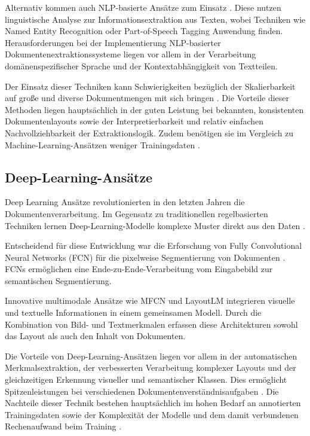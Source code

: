 Alternativ kommen auch NLP-basierte Ansätze zum Einsatz \parencite{ChowdhuryGobindaG.1999Tmfi, MarinaiS.2005Annf}. Diese nutzen linguistische Analyse zur Informationsextraktion aus Texten, wobei Techniken wie Named Entity Recognition oder Part-of-Speech Tagging Anwendung finden. Herausforderungen bei der Implementierung NLP-basierter Dokumentenextraktionssysteme liegen vor allem in der Verarbeitung domänenspezifischer Sprache und der Kontextabhängigkeit von Textteilen.

Der Einsatz dieser Techniken kann Schwierigkeiten bezüglich der Skalierbarkeit auf große und diverse Dokumentmengen mit sich bringen \parencite{ChowdhuryGobindaG.1999Tmfi, YeYibin2018Auso}. Die Vorteile dieser Methoden liegen hauptsächlich in der guten Leistung bei bekannten, konsistenten Dokumentenlayouts sowie der Interpretierbarkeit und relativ einfachen Nachvollziehbarkeit der Extraktionslogik. Zudem benötigen sie im Vergleich zu Machine-Learning-Ansätzen weniger Trainingsdaten \parencite{ChowdhuryGobindaG.1999Tmfi, MarinaiS.2005Annf}.

\subsection{Deep-Learning-Ansätze}
\label{subsec:deep-learning-ansätze}

Deep Learning Ansätze revolutionierten in den letzten Jahren die Dokumentenverarbeitung. Im Gegensatz zu traditionellen regelbasierten Techniken lernen Deep-Learning-Modelle komplexe Muster direkt aus den Daten \parencite{YangXiao2017LtES, XuYiheng2020LPoT}.

Entscheidend für diese Entwicklung war die Erforschung von Fully Convolutional Neural Networks (FCN) für die pixelweise Segmentierung von Dokumenten \parencite{YangXiao2017LtES}. FCNs ermöglichen eine Ende-zu-Ende-Verarbeitung vom Eingabebild zur semantischen Segmentierung.

Innovative multimodale Ansätze wie MFCN \parencite{YangXiao2017LtES} und LayoutLM \parencite{XuYiheng2020LPoT} integrieren visuelle und textuelle Informationen in einem gemeinsamen Modell. Durch die Kombination von Bild- und Textmerkmalen erfassen diese Architekturen sowohl das Layout als auch den Inhalt von Dokumenten.

Die Vorteile von Deep-Learning-Ansätzen liegen vor allem in der automatischen Merkmalsextraktion, der verbesserten Verarbeitung komplexer Layouts und der gleichzeitigen Erkennung visueller und semantischer Klassen. Dies ermöglicht Spitzenleistungen bei verschiedenen Dokumentenverständnisaufgaben \parencite{YangXiao2017LtES, XuYiheng2020LPoT}. Die Nachteile dieser Technik bestehen hauptsächlich im hohen Bedarf an annotierten Trainingsdaten sowie der Komplexität der Modelle und dem damit verbundenen Rechenaufwand beim Training \parencite{YangXiao2017LtES, XuYiheng2020LPoT}.

